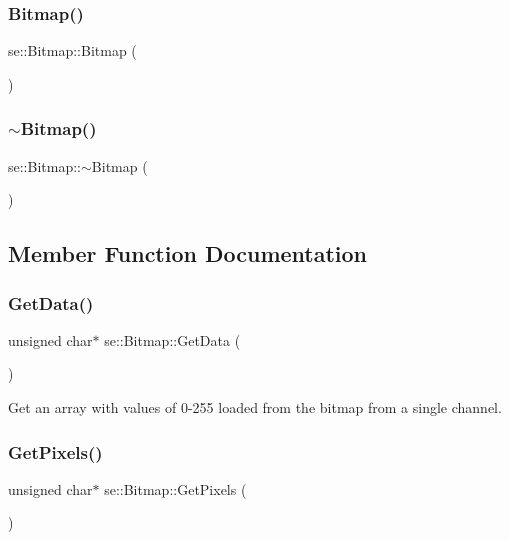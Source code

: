 \subsubsection{\texorpdfstring{Bitmap()}{Bitmap()}}
{\footnotesize\ttfamily se\+::\+Bitmap\+::\+Bitmap (\begin{DoxyParamCaption}{ }\end{DoxyParamCaption})}

\mbox{\label{classse_1_1_bitmap_aa098fcae7998e75240e46594fe84996e}} 
\subsubsection{\texorpdfstring{$\sim$\+Bitmap()}{~Bitmap()}}
{\footnotesize\ttfamily se\+::\+Bitmap\+::$\sim$\+Bitmap (\begin{DoxyParamCaption}{ }\end{DoxyParamCaption})}



\subsection{Member Function Documentation}
\mbox{\label{classse_1_1_bitmap_a2467e494eccacc94756c3f02b0d0cc5e}} 
\subsubsection{\texorpdfstring{Get\+Data()}{GetData()}}
{\footnotesize\ttfamily unsigned char$\ast$ se\+::\+Bitmap\+::\+Get\+Data (\begin{DoxyParamCaption}{ }\end{DoxyParamCaption})}

Get an array with values of 0-\/255 loaded from the bitmap from a single channel. \mbox{\label{classse_1_1_bitmap_a7e0aa0d86804f241261c46307447a4f5}} 
\subsubsection{\texorpdfstring{Get\+Pixels()}{GetPixels()}}
{\footnotesize\ttfamily unsigned char$\ast$ se\+::\+Bitmap\+::\+Get\+Pixels (\begin{DoxyParamCaption}{ }\end{DoxyParamCaption})}

